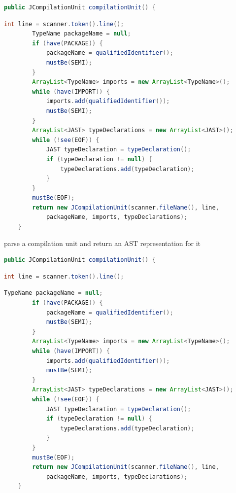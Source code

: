 \documentclass[8pt,a4paper,compress]{beamer}
\begin{document}
\begin{frame}[fragile]
\begin{overprint}
\begin{tcolorbox}[enhanced,drop shadow southwest,sharp corners,size=fbox,colback=white,fontlower=\small\ttfamily,collower=silver900]
\begin{lstlisting}[language=Java,style=focusin,backgroundcolor=\color{lime100}]
    public JCompilationUnit compilationUnit() {
\end{lstlisting}
\begin{lstlisting}[language=Java,style=focusout]
        int line = scanner.token().line();
        TypeName packageName = null;
        if (have(PACKAGE)) {
            packageName = qualifiedIdentifier();
            mustBe(SEMI);
        }
        ArrayList<TypeName> imports = new ArrayList<TypeName>();
        while (have(IMPORT)) {
            imports.add(qualifiedIdentifier());
            mustBe(SEMI);
        }
        ArrayList<JAST> typeDeclarations = new ArrayList<JAST>();
        while (!see(EOF)) {
            JAST typeDeclaration = typeDeclaration();
            if (typeDeclaration != null) {
                typeDeclarations.add(typeDeclaration);
            }
        }
        mustBe(EOF);
        return new JCompilationUnit(scanner.fileName(), line, 
            packageName, imports, typeDeclarations);
    }
\end{lstlisting}

\tcblower
\begin{minipage}[t][.25cm][t]{\textwidth}
parse a compilation unit and return an AST representation for it
\end{minipage}
\end{tcolorbox}

\begin{tcolorbox}[enhanced,drop shadow southwest,sharp corners,size=fbox,colback=white,fontlower=\small\ttfamily,collower=silver900]

\begin{lstlisting}[language=Java,style=focusout]
    public JCompilationUnit compilationUnit() {
\end{lstlisting}
\begin{lstlisting}[language=Java,style=focusin,backgroundcolor=\color{lime100}]
        int line = scanner.token().line();
\end{lstlisting}
\begin{lstlisting}[language=Java,style=focusout]
        TypeName packageName = null;
        if (have(PACKAGE)) {
            packageName = qualifiedIdentifier();
            mustBe(SEMI);
        }
        ArrayList<TypeName> imports = new ArrayList<TypeName>();
        while (have(IMPORT)) {
            imports.add(qualifiedIdentifier());
            mustBe(SEMI);
        }
        ArrayList<JAST> typeDeclarations = new ArrayList<JAST>();
        while (!see(EOF)) {
            JAST typeDeclaration = typeDeclaration();
            if (typeDeclaration != null) {
                typeDeclarations.add(typeDeclaration);
            }
        }
        mustBe(EOF);
        return new JCompilationUnit(scanner.fileName(), line, 
            packageName, imports, typeDeclarations);
    }
\end{lstlisting}


\end{tcolorbox}
\end{overprint}
\end{frame}
\end{document}
